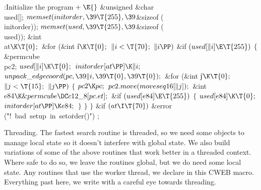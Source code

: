 \Y\B\4:Initialize the program\X${}\mathrel+\E{}$\6
\&{unsigned} \&{char} \\{used}[];\7
${}\\{memset}(\\{initorder},\39\T{255},\39{}$\&{sizeof} (\\{initorder}));\6
${}\\{memset}(\\{used},\39\T{255},\39{}$\&{sizeof} (\\{used}));\7
\&{int} \\{at}${}\K\T{0};{}$\7
\&{for} (\&{int} \|i${}\K\T{0};{}$ ${}\|i<\T{70};{}$ ${}\|i\PP){}$\1\6
\&{if} ${}(\\{used}[\|i]\E\T{255}){}$\5
${}\{{}$\1\6
\&{permcube} \\{pc2};\7
${}\\{used}[\|i]\K\T{0};{}$\6
${}\\{initorder}[\\{at}\PP]\K\|i;{}$\6
${}\\{unpack\_edgecoord}(\\{pc},\39\|i,\39\T{0},\39\T{0});{}$\6
\&{for} (\&{int} \|j${}\K\T{0};{}$ ${}\|j<\T{15};{}$ ${}\|j\PP){}$\5
${}\{{}$\1\6
${}\\{pc2}\K\\{pc};{}$\6
${}\\{pc2}.\\{move}(\\{moveseq16}[\|j]);{}$\7
\&{int} \\{e84}${}\K\&{permcube}\DC\\{c12\_8}[\\{pc}.\\{et}];{}$\7
\&{if} ${}(\\{used}[\\{e84}]\E\T{255}){}$\5
${}\{{}$\1\6
${}\\{used}[\\{e84}]\K\T{0};{}$\6
${}\\{initorder}[\\{at}\PP]\K\\{e84};{}$\6
\4${}\}{}$\2\6
\4${}\}{}$\2\6
\4${}\}{}$\2\2\6
\&{if} ${}(\\{at}\I\T{70}){}$\1\6
\&{error} (\.{"!\ bad\ setup\ in\ seto}\)\.{rder()"})\1\5
;\2\2\par
\fi

Threading.
The fastest search routine is threaded, so we need some objects
to manage local state so it doesn't interfere with global state.
We also build variations of some of the above routines that work
better in a threaded context.  Where safe to do so, we leave
the routines global, but we do need some local state.  Any
routines that use the worker thread, we declare in this CWEB
macro.  Everything past here, we write with a careful eye
towards threading.

